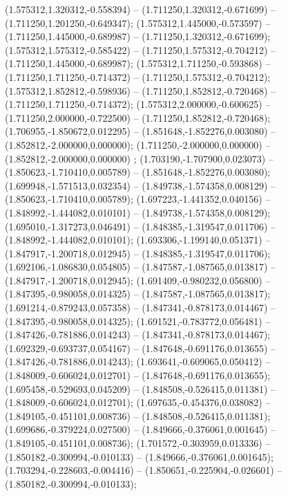 (1.575312,1.320312,-0.558394) -- (1.711250,1.320312,-0.671699) -- (1.711250,1.201250,-0.649347);
 (1.575312,1.445000,-0.573597) -- (1.711250,1.445000,-0.689987) -- (1.711250,1.320312,-0.671699);
 (1.575312,1.575312,-0.585422) -- (1.711250,1.575312,-0.704212) -- (1.711250,1.445000,-0.689987);
 (1.575312,1.711250,-0.593868) -- (1.711250,1.711250,-0.714372) -- (1.711250,1.575312,-0.704212);
 (1.575312,1.852812,-0.598936) -- (1.711250,1.852812,-0.720468) -- (1.711250,1.711250,-0.714372);
 (1.575312,2.000000,-0.600625) -- (1.711250,2.000000,-0.722500) -- (1.711250,1.852812,-0.720468);
 (1.706955,-1.850672,0.012295) -- (1.851648,-1.852276,0.003080) -- (1.852812,-2.000000,0.000000);
 (1.711250,-2.000000,0.000000) -- (1.852812,-2.000000,0.000000) ;
 (1.703190,-1.707900,0.023073) -- (1.850623,-1.710410,0.005789) -- (1.851648,-1.852276,0.003080);
 (1.699948,-1.571513,0.032354) -- (1.849738,-1.574358,0.008129) -- (1.850623,-1.710410,0.005789);
 (1.697223,-1.441352,0.040156) -- (1.848992,-1.444082,0.010101) -- (1.849738,-1.574358,0.008129);
 (1.695010,-1.317273,0.046491) -- (1.848385,-1.319547,0.011706) -- (1.848992,-1.444082,0.010101);
 (1.693306,-1.199140,0.051371) -- (1.847917,-1.200718,0.012945) -- (1.848385,-1.319547,0.011706);
 (1.692106,-1.086830,0.054805) -- (1.847587,-1.087565,0.013817) -- (1.847917,-1.200718,0.012945);
 (1.691409,-0.980232,0.056800) -- (1.847395,-0.980058,0.014325) -- (1.847587,-1.087565,0.013817);
 (1.691214,-0.879243,0.057358) -- (1.847341,-0.878173,0.014467) -- (1.847395,-0.980058,0.014325);
 (1.691521,-0.783772,0.056481) -- (1.847426,-0.781886,0.014243) -- (1.847341,-0.878173,0.014467);
 (1.692329,-0.693737,0.054167) -- (1.847648,-0.691176,0.013655) -- (1.847426,-0.781886,0.014243);
 (1.693641,-0.609065,0.050412) -- (1.848009,-0.606024,0.012701) -- (1.847648,-0.691176,0.013655);
 (1.695458,-0.529693,0.045209) -- (1.848508,-0.526415,0.011381) -- (1.848009,-0.606024,0.012701);
 (1.697635,-0.454376,0.038082) -- (1.849105,-0.451101,0.008736) -- (1.848508,-0.526415,0.011381);
 (1.699686,-0.379224,0.027500) -- (1.849666,-0.376061,0.001645) -- (1.849105,-0.451101,0.008736);
 (1.701572,-0.303959,0.013336) -- (1.850182,-0.300994,-0.010133) -- (1.849666,-0.376061,0.001645);
 (1.703294,-0.228603,-0.004416) -- (1.850651,-0.225904,-0.026601) -- (1.850182,-0.300994,-0.010133);
